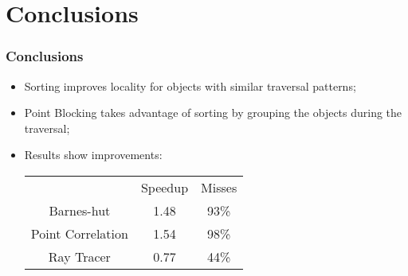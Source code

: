 \section{Conclusions}
\begin{frame}
	\frametitle{Conclusions}
	\begin{itemize}
		\item Sorting improves locality for objects with similar traversal patterns;

		\item Point Blocking takes advantage of sorting by grouping the objects during the traversal;

		\item Results show improvements:
		\begin{table}
			\begin{tabular}{|c|cc|}
				& Speedup & Misses	\\
				Barnes-hut &  1.48 & 93\%	\\
				Point Correlation & 1.54 & 98\%	\\
				Ray Tracer & 0.77 & 44\%
			\end{tabular}
		\end{table}
	\end{itemize}
\end{frame}